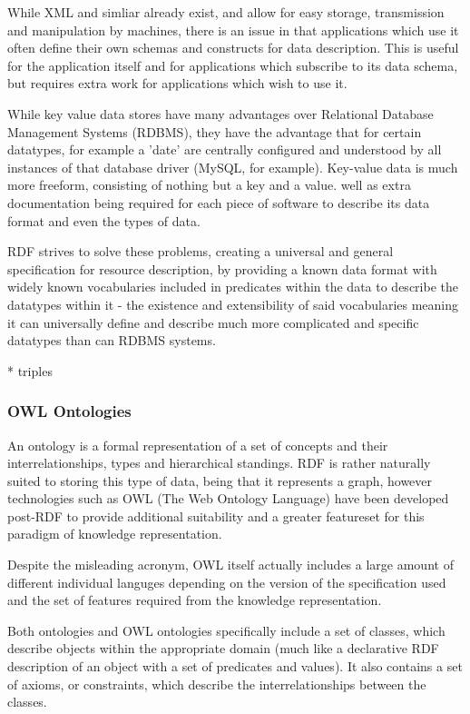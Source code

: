 \documentclass{article}
\begin{document}
While XML and simliar already exist, and allow for easy storage, transmission 
and manipulation by machines, there is an issue in that applications which use
it often define their own schemas and constructs for data description. This is
useful for the application itself and for applications which subscribe to its
data schema, but requires extra work for applications which wish to use it.

While key value data stores have many advantages over Relational Database
Management Systems (RDBMS), they have the advantage that for certain datatypes,
for example a 'date' are centrally configured and understood by all instances of
that database driver (MySQL, for example). Key-value data is much more freeform,
consisting of nothing but a key and a value. 
well as extra documentation being required for each piece of software to
describe its data format and even the types of data. 

RDF strives to solve these problems, creating a universal and general
specification for resource description, by providing a known data format with
widely known vocabularies included in predicates within the data to describe 
the datatypes within it - the existence and extensibility of said vocabularies 
meaning it can universally define and describe much more complicated and 
specific datatypes than can RDBMS systems.

* triples

\subsubsection{OWL Ontologies}

An ontology is a formal representation of a set of concepts and their
interrelationships, types and hierarchical standings. RDF is rather naturally
suited to storing this type of data, being that it represents a graph, however
technologies such as OWL (The Web Ontology Language) have been developed
post-RDF to provide additional suitability and a greater featureset for this
paradigm of knowledge representation.

Despite the misleading acronym, OWL itself actually includes a large amount of
different individual languges depending on the version of the specification used
and the set of features required from the knowledge representation.

Both ontologies and OWL ontologies specifically include a set of classes, which 
describe objects within the appropriate domain (much like a declarative RDF 
description of an object with a set of predicates and values). It also contains
a set of axioms, or constraints, which describe the interrelationships between
the classes.
\end{document}
